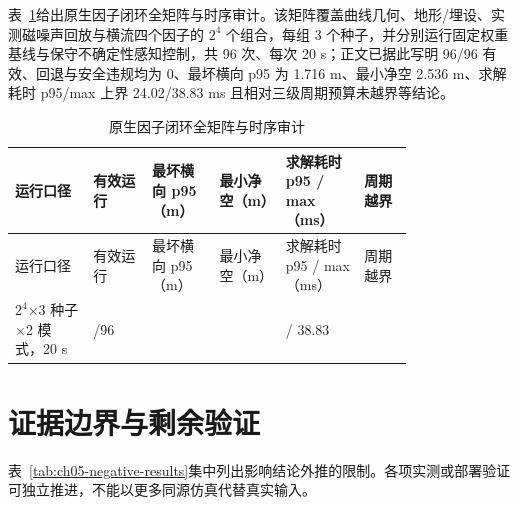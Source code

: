 表~\ref{tab:ch05-r22-native-factorial}给出原生因子闭环全矩阵与时序审计。该矩阵覆盖曲线几何、地形/埋设、实测磁噪声回放与横流四个因子的 \(2^4\) 个组合，每组 3 个种子，并分别运行固定权重基线与保守不确定性感知控制，共 96 次、每次 20 s；正文已据此写明 96/96 有效、回退与安全违规均为 0、最坏横向 p95 为 1.716 m、最小净空 2.536 m、求解耗时 p95/max 上界 24.02/38.83 ms 且相对三级周期预算未越界等结论。

\begingroup
\small
\setlength{\tabcolsep}{3pt}
\begin{longtable}[]{@{}
  >{\raggedright\arraybackslash}p{0.16\linewidth}
  >{\centering\arraybackslash}p{0.12\linewidth}
  >{\centering\arraybackslash}p{0.13\linewidth}
  >{\centering\arraybackslash}p{0.12\linewidth}
  >{\centering\arraybackslash}p{0.16\linewidth}
  >{\centering\arraybackslash}p{0.10\linewidth}@{}}
\caption{原生因子闭环全矩阵与时序审计}\label{tab:ch05-r22-native-factorial}\tabularnewline
\toprule\noalign{}
运行口径 & 有效运行 & 最坏横向 p95（m） & 最小净空（m） & 求解耗时 p95 / max（ms） & 周期越界 \\
\midrule\noalign{}
\endfirsthead
\toprule\noalign{}
运行口径 & 有效运行 & 最坏横向 p95（m） & 最小净空（m） & 求解耗时 p95 / max（ms） & 周期越界 \\
\midrule\noalign{}
\endhead
\bottomrule\noalign{}
\endlastfoot
\(2^4\)×3 种子×2 模式，20 s & 96/96 & 1.716 & 2.536 & 24.02 / 38.83 & 0 \\
\end{longtable}
\endgroup

\section{证据边界与剩余验证}\label{sec:app-a-12}

表~\ref{tab:ch05-negative-results}集中列出影响结论外推的限制。各项实测或部署验证可独立推进，不能以更多同源仿真代替真实输入。

